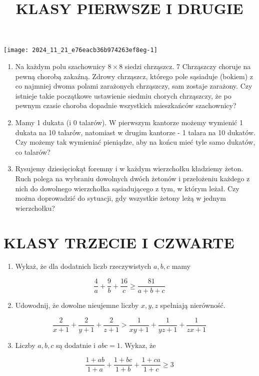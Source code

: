 \documentclass[10pt]{article}
\title{KLASY PIERWSZE I DRUGIE }
\author{}
\date{}
\begin{document}
\maketitle
\begin{center}
\texttt{[image: 2024\_11\_21\_e76eacb36b974263ef8eg-1]}
\end{center}

\begin{enumerate}
  \item Na każdym polu szachownicy \(8 \times 8\) siedzi chrząszcz. 7 Chrząszczy choruje na pewną chorobą zakaźną. Zdrowy chrząszcz, którego pole sąsiaduje (bokiem) z co najmniej dwoma polami zarażonych chrząszczy, sam zostaje zarażony. Czy istnieje takie początkowe ustawienie siedmiu chorych chrząszczy, że po pewnym czasie choroba dopadnie wszystkich mieszkańców szachownicy?
  \item Mamy 1 dukata (i 0 talarów). W pierwszym kantorze możemy wymienić 1 dukata na 10 talarów, natomiast w drugim kantorze - 1 talara na 10 dukatów. Czy możemy tak wymieniać pieniądze, aby na końcu mieć tyle samo dukatów, co talarów?
  \item Rysujemy dziesięciokąt foremny i w każdym wierzchołku kładziemy żeton. Ruch polega na wybraniu dowolnych dwóch żetonów i przełożeniu każdego z nich do dowolnego wierzchołka sąsiadującego z tym, w którym leżał. Czy można doprowadzić do sytuacji, gdy wszystkie żetony leżą w jednym wierzchołku?
\end{enumerate}

\section*{KLASY TRZECIE I CZWARTE}
\begin{enumerate}
  \item Wykaż, że dla dodatnich liczb rzeczywistych \(a, b, c\) mamy
\end{enumerate}

\[
\frac{4}{a}+\frac{9}{b}+\frac{16}{c} \geq \frac{81}{a+b+c}
\]

\begin{enumerate}
  \setcounter{enumi}{1}
  \item Udowodnij, że dowolne nieujemne liczby \(x, y, z\) spełniają nierówność.
\end{enumerate}

\[
\frac{2}{x+1}+\frac{2}{y+1}+\frac{2}{z+1}>\frac{1}{x y+1}+\frac{1}{y z+1}+\frac{1}{z x+1}
\]

\begin{enumerate}
  \setcounter{enumi}{2}
  \item Liczby \(a, b, c\) są dodatnie i \(a b c=1\). Wykaz, że
\end{enumerate}

\[
\frac{1+a b}{1+a}+\frac{1+b c}{1+b}+\frac{1+c a}{1+c} \geq 3
\]
\end{document}
